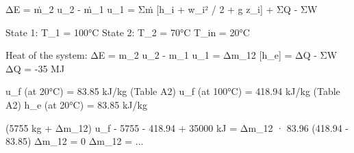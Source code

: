 ΔE = ṁ_2 u_2 - ṁ_1 u_1 = Σṁ [h_i + w_i² / 2 + g z_i] + ΣQ - ΣW  

State 1:  
T_1 = 100°C  
State 2:  
T_2 = 70°C  
T_in = 20°C  

Heat of the system:  
ΔE = m_2 u_2 - m_1 u_1 = Δm_12 [h_e] = ΔQ - ΣW  
ΔQ = -35 MJ  

u_f (at 20°C) = 83.85 kJ/kg (Table A2)  
u_f (at 100°C) = 418.94 kJ/kg (Table A2)  
h_e (at 20°C) = 83.85 kJ/kg  

(5755 kg + Δm_12) u_f - 5755 - 418.94 + 35000 kJ = Δm_12 · 83.96  
(418.94 - 83.85) Δm_12 = 0  
Δm_12 = ...